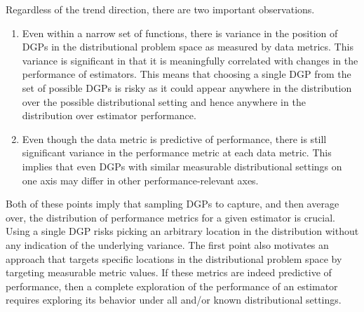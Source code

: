 \documentclass[../main.tex]{subfiles}
\begin{document}
Regardless of the trend direction, there are two important observations.

\begin{enumerate}
    \item Even within a narrow set of functions, there is variance in the position of DGPs in the distributional problem space as measured by data metrics. This variance is significant in that it is meaningfully correlated with changes in the performance of estimators. This means that choosing a single DGP from the set of possible DGPs is risky as it could appear anywhere in the distribution over the possible distributional setting and hence anywhere in the distribution over estimator performance.
    
    \item Even though the data metric is predictive of performance, there is still significant variance in the performance metric at each data metric. This implies that even DGPs with similar measurable distributional settings on one axis may differ in other performance-relevant axes.
\end{enumerate}

Both of these points imply that sampling DGPs to capture, and then average over, the distribution of performance metrics for a given estimator is crucial. Using a single DGP risks picking an arbitrary location in the distribution without any indication of the underlying variance. The first point also motivates an approach that targets specific locations in the distributional problem space by targeting measurable metric values. If these metrics are indeed predictive of performance, then a complete exploration of the performance of an estimator requires exploring its behavior under all and/or known distributional settings.
\end{document}
